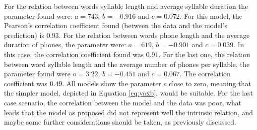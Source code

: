 For the relation between words syllable length and average syllable duration the parameter found were:
$a = 743$, $b = -0.916$ and $c = 0.072$. For this model, the Pearson's correlation coefficient found
(between the data and the model's prediction) is $0.93$.
For the  relation between words phone length and the average duration 
of phones, the parameter were: $a = 619$, $b = -0.901$ and $c = 0.039$.
In this case, the correlation coefficient found was $0.91$.
For the last one, the relation between word syllable length and the average number of phones per syllable, the
parameter found were $a = 3.22$, $b = -0.451$ and $c = 0.067$. The correlation coefficient was $0.49$.
All models show the parameter $c$ close to zero, meaning that the simpler model, depicted
in Equation \ref{eq:yaxb}, would be suitable. For the last case scenario, the correlation between the model
and the data was poor, what leads that the model as proposed did not represent well the intrinsic relation,
and maybe some further considerations should be taken, as previously discussed.

